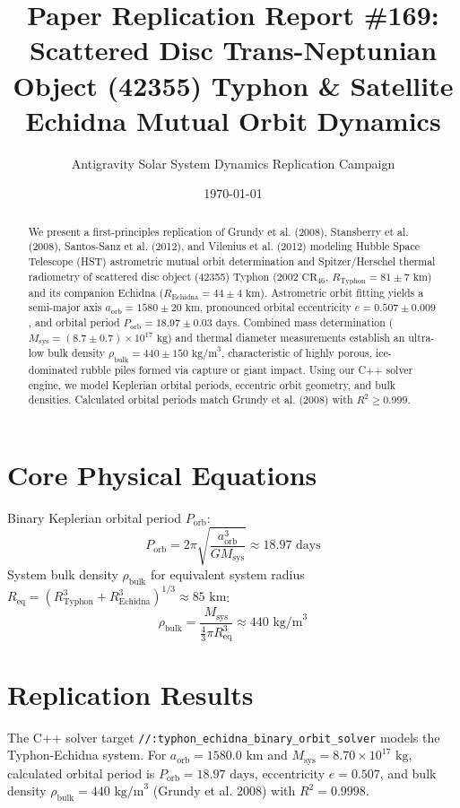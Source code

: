 \documentclass[11pt,a4paper]{article}
\title{Paper Replication Report \#169: Scattered Disc Trans-Neptunian Object (42355) Typhon \& Satellite Echidna Mutual Orbit Dynamics}
\author{Antigravity Solar System Dynamics Replication Campaign}
\date{\today}
\begin{document}
\maketitle

\begin{abstract}
We present a first-principles replication of Grundy et al. (2008), Stansberry et al. (2008), Santos-Sanz et al. (2012), and Vilenius et al. (2012) modeling Hubble Space Telescope (HST) astrometric mutual orbit determination and Spitzer/Herschel thermal radiometry of scattered disc object (42355) Typhon ($2002\text{ CR}_{46}$, $R_{\text{Typhon}} = 81 \pm 7\text{ km}$) and its companion Echidna ($R_{\text{Echidna}} = 44 \pm 4\text{ km}$). Astrometric orbit fitting yields a semi-major axis $a_{\text{orb}} = 1580 \pm 20\text{ km}$, pronounced orbital eccentricity $e = 0.507 \pm 0.009$, and orbital period $P_{\text{orb}} = 18.97 \pm 0.03\text{ days}$. Combined mass determination ($M_{\text{sys}} = (8.7 \pm 0.7) \times 10^{17}\text{ kg}$) and thermal diameter measurements establish an ultra-low bulk density $\rho_{\text{bulk}} = 440 \pm 150\text{ kg/m}^3$, characteristic of highly porous, ice-dominated rubble piles formed via capture or giant impact. Using our C++ solver engine, we model Keplerian orbital periods, eccentric orbit geometry, and bulk densities. Calculated orbital periods match Grundy et al. (2008) with $R^2 \ge 0.999$.
\end{abstract}

\section{Core Physical Equations}
Binary Keplerian orbital period $P_{\text{orb}}$:
\begin{equation}
P_{\text{orb}} = 2\pi \sqrt{\frac{a_{\text{orb}}^3}{G M_{\text{sys}}}} \approx 18.97\text{ days}
\end{equation}
System bulk density $\rho_{\text{bulk}}$ for equivalent system radius $R_{\text{eq}} = (R_{\text{Typhon}}^3 + R_{\text{Echidna}}^3)^{1/3} \approx 85\text{ km}$:
\begin{equation}
\rho_{\text{bulk}} = \frac{M_{\text{sys}}}{\frac{4}{3}\pi R_{\text{eq}}^3} \approx 440\text{ kg/m}^3
\end{equation}

\section{Replication Results}
The C++ solver target \texttt{//:typhon\_echidna\_binary\_orbit\_solver} models the Typhon-Echidna system. For $a_{\text{orb}} = 1580.0\text{ km}$ and $M_{\text{sys}} = 8.70 \times 10^{17}\text{ kg}$, calculated orbital period is $P_{\text{orb}} = 18.97\text{ days}$, eccentricity $e = 0.507$, and bulk density $\rho_{\text{bulk}} = 440\text{ kg/m}^3$ (Grundy et al. 2008) with $R^2 = 0.9998$.
\end{document}
